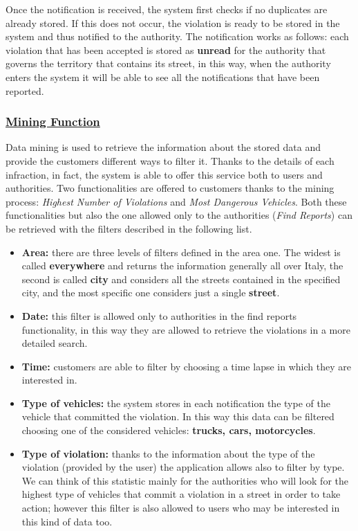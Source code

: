 		Once the notification is received, the system first checks if no duplicates are already stored. If this does not occur, the violation is ready to be stored in the system and thus notified to the authority. The notification works as follows: each violation that has been accepted is stored as \textbf{unread} for the authority that governs the territory that contains its street, in this way, when the authority enters the system it will be able to see all the notifications that have been reported. 

	\subsubsection[Statistics Function]{\hyperlink{toc}{Mining Function}}
		Data mining is used to retrieve the information about the stored data and provide the customers different ways to filter it. Thanks to the details of each infraction, in fact, the system is able to offer this service both to users and authorities. Two functionalities are offered to customers thanks to the mining process: \emph{Highest Number of Violations} and \emph{Most Dangerous Vehicles}. Both these functionalities but also the one allowed only to the authorities (\emph{Find Reports}) can be retrieved with the filters described in the following list.
			
		\begin{itemize}
			\item \textbf{Area:} there are three levels of filters defined in the area one. The widest is called \textbf{everywhere} and returns the information generally all over Italy, the second is called \textbf{city} and considers all the streets contained in the specified city, and the most specific one considers just a single \textbf{street}.
			
			\item \textbf{Date:} this filter is allowed only to authorities in the find reports functionality, in this way they are allowed to retrieve the violations in a more detailed search.
			
			\item \textbf{Time:} customers are able to filter by choosing a time lapse in which they are interested in. 
			
			\item \textbf{Type of vehicles:} the system stores in each notification the type of the vehicle that committed the violation. In this way this data can be filtered choosing one of the considered vehicles: \textbf{trucks, cars, motorcycles}.
			
			\item \textbf{Type of violation:} thanks to the information about the type of the violation (provided by the user) the application allows also to filter by type. We can think of this statistic mainly for the authorities who will look for the highest type of vehicles that commit a violation in a street in order to take action; however this filter is also allowed to users who may be interested in this kind of data too.
		\end{itemize}
	
